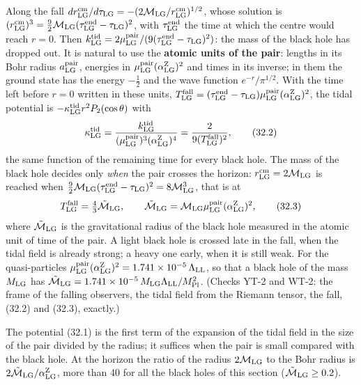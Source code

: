 \documentclass[
  10pt,
]{article}
\begin{document}
Along the fall
\(dr^{\rm cm}_{\rm LG}/d\tau_{\rm LG}=-(2\mathcal M_{\rm LG}/r^{\rm cm}_{\rm LG})^{1/2}\),
whose solution is
\((r^{\rm cm}_{\rm LG})^3=\tfrac92\mathcal M_{\rm LG}(\tau^{\rm end}_{\rm LG}-\tau_{\rm LG})^2\),
with \(\tau^{\rm end}_{\rm LG}\) the time at which the centre would
reach \(r=0\). Then
\(k^{\rm tid}_{\rm LG}=2\mu^{\rm pair}_{\rm LG}/(9(\tau^{\rm end}_{\rm LG}-\tau_{\rm LG})^2)\):
the mass of the black hole has dropped out. It is natural to use the
\textbf{atomic units of the pair}: lengths in its Bohr radius
\(a^{\rm pair}_{\rm LG}\), energies in
\(\mu^{\rm pair}_{\rm LG}(\alpha^{\rm Z}_{\rm LG})^2\) and times in its
inverse; in them the ground state has the energy \(-\tfrac12\) and the
wave function \(e^{-r}/\pi^{1/2}\). With the time left before \(r=0\)
written in these units,
\(T^{\rm fall}_{\rm LG}=(\tau^{\rm end}_{\rm LG}-\tau_{\rm LG})\mu^{\rm pair}_{\rm LG}(\alpha^{\rm Z}_{\rm LG})^2\),
the tidal potential is \(-\kappa^{\rm tid}_{\rm LG}r^2P_2(\cos\theta)\)
with
\[\kappa^{\rm tid}_{\rm LG}=\frac{k^{\rm tid}_{\rm LG}}{(\mu^{\rm pair}_{\rm LG})^3(\alpha^{\rm Z}_{\rm LG})^4}=\frac2{9(T^{\rm fall}_{\rm LG})^2},\tag{32.2}\]
the same function of the remaining time for every black hole. The mass
of the black hole decides only \emph{when} the pair crosses the horizon:
\(r^{\rm cm}_{\rm LG}=2\mathcal M_{\rm LG}\) is reached when
\(\tfrac92\mathcal M_{\rm LG}(\tau^{\rm end}_{\rm LG}-\tau_{\rm LG})^2=8\mathcal M_{\rm LG}^3\),
that is at
\[T^{\rm fall}_{\rm LG}=\tfrac43\tilde{\mathcal M}_{\rm LG},\qquad\tilde{\mathcal M}_{\rm LG}=\mathcal M_{\rm LG}\mu^{\rm pair}_{\rm LG}(\alpha^{\rm Z}_{\rm LG})^2,\tag{32.3}\]
where \(\tilde{\mathcal M}_{\rm LG}\) is the gravitational radius of the
black hole measured in the atomic unit of time of the pair. A light
black hole is crossed late in the fall, when the tidal field is already
strong; a heavy one early, when it is still weak. For the
quasi-particles
\(\mu^{\rm pair}_{\rm LG}(\alpha^{\rm Z}_{\rm LG})^2=1.741\times10^{-5}\,\Lambda_{\rm LL}\),
so that a black hole of the mass \(M_{\rm LG}\) has
\(\tilde{\mathcal M}_{\rm LG}=1.741\times10^{-5}\,M_{\rm LG}\Lambda_{\rm LL}/M_{\rm Pl}^2\).
(Checks YT-2 and WT-2: the frame of the falling observers, the tidal
field from the Riemann tensor, the fall, (32.2) and (32.3), exactly.)

The potential (32.1) is the first term of the expansion of the tidal
field in the size of the pair divided by the radius; it suffices when
the pair is small compared with the black hole. At the horizon the ratio
of the radius \(2\mathcal M_{\rm LG}\) to the Bohr radius is
\(2\tilde{\mathcal M}_{\rm LG}/\alpha^{\rm Z}_{\rm LG}\), more than 40
for all the black holes of this section
(\(\tilde{\mathcal M}_{\rm LG}\ge0.2\)).
\end{document}
